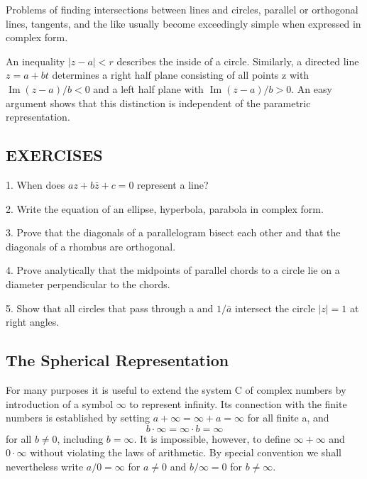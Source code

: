 Problems of finding intersections between lines and circles, parallel or orthogonal lines, tangents, and the like usually become exceedingly simple when expressed in complex form.

An inequality $|z - a| < r$ describes the inside of a circle. Similarly, a directed line $z = a + bt$ determines a right half plane consisting of all points z with $\operatorname{Im}(z - a)/b < 0$ and a left half plane with $\operatorname{Im}(z - a)/b > 0$. An easy argument shows that this distinction is independent of the parametric representation.

\subsection*{EXERCISES}
1. When does $az + b\bar{z} + c = 0$ represent a line?

2. Write the equation of an ellipse, hyperbola, parabola in complex form.

3. Prove that the diagonals of a parallelogram bisect each other and that the diagonals of a rhombus are orthogonal.

4. Prove analytically that the midpoints of parallel chords to a circle lie on a diameter perpendicular to the chords.

5. Show that all circles that pass through a and $1/\bar{a}$ intersect the circle $|z| = 1$ at right angles.


\setcounter{section}{2}\setcounter{subsection}{3}\subsection{The Spherical Representation}\label{sec:1.2.4}
For many purposes it is useful to extend the system C of complex numbers by introduction of a symbol $\infty$ to represent infinity. Its connection with the finite numbers is established by setting $a + \infty = \infty + a = \infty$ for all finite a, and
\begin{equation*}
b \cdot \infty = \infty \cdot b = \infty
\end{equation*}
for all $b \neq 0$, including $b = \infty$. It is impossible, however, to define $\infty + \infty$ and $0 \cdot \infty$ without violating the laws of arithmetic. By special convention we shall nevertheless write $a/0 = \infty$ for $a \neq 0$ and $b/\infty = 0$ for $b \neq \infty$.

